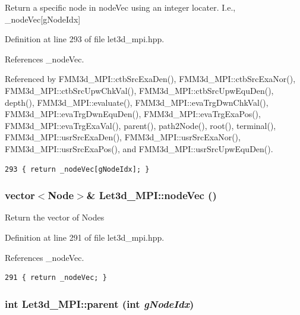 Return a specific node in node\-Vec using an integer locater. I.e., \_\-node\-Vec[g\-Node\-Idx] 

Definition at line 293 of file let3d\_\-mpi.hpp.

References \_\-node\-Vec.

Referenced by FMM3d\_\-MPI::ctb\-Src\-Exa\-Den(), FMM3d\_\-MPI::ctb\-Src\-Exa\-Nor(), FMM3d\_\-MPI::ctb\-Src\-Upw\-Chk\-Val(), FMM3d\_\-MPI::ctb\-Src\-Upw\-Equ\-Den(), depth(), FMM3d\_\-MPI::evaluate(), FMM3d\_\-MPI::eva\-Trg\-Dwn\-Chk\-Val(), FMM3d\_\-MPI::eva\-Trg\-Dwn\-Equ\-Den(), FMM3d\_\-MPI::eva\-Trg\-Exa\-Pos(), FMM3d\_\-MPI::eva\-Trg\-Exa\-Val(), parent(), path2Node(), root(), terminal(), FMM3d\_\-MPI::usr\-Src\-Exa\-Den(), FMM3d\_\-MPI::usr\-Src\-Exa\-Nor(), FMM3d\_\-MPI::usr\-Src\-Exa\-Pos(), and FMM3d\_\-MPI::usr\-Src\-Upw\-Equ\-Den().

\footnotesize\begin{verbatim}293 { return _nodeVec[gNodeIdx]; }
\end{verbatim}\normalsize 


\subsubsection{\setlength{\rightskip}{0pt plus 5cm}vector$<${\bf Node}$>$\& Let3d\_\-MPI::node\-Vec ()\hspace{0.3cm}{\tt  [inline]}}\label{classLet3d__MPI_44c0c8da466878274feb4ce060c10b9b_44c0c8da466878274feb4ce060c10b9b}


Return the vector of Nodes 

Definition at line 291 of file let3d\_\-mpi.hpp.

References \_\-node\-Vec.

\footnotesize\begin{verbatim}291 { return _nodeVec; }
\end{verbatim}\normalsize 


\subsubsection{\setlength{\rightskip}{0pt plus 5cm}int Let3d\_\-MPI::parent (int {\em g\-Node\-Idx})\hspace{0.3cm}{\tt  [inline]}}\label{classLet3d__MPI_eedcae6652a6a95ae0ef366d7e8ad0ef_eedcae6652a6a95ae0ef366d7e8ad0ef}



